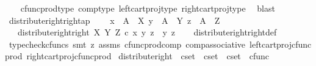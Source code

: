 \begin{isabellebody}
\ \ \isamarkupfalse%
\ cfunc{\isacharunderscore}{\kern0pt}prod{\isacharunderscore}{\kern0pt}type\ comp{\isacharunderscore}{\kern0pt}type\ left{\isacharunderscore}{\kern0pt}cart{\isacharunderscore}{\kern0pt}proj{\isacharunderscore}{\kern0pt}type\ right{\isacharunderscore}{\kern0pt}cart{\isacharunderscore}{\kern0pt}proj{\isacharunderscore}{\kern0pt}type\ \isamarkupfalse%
\ blast%
\endisatagproof
{\isafoldproof}%
%
\isadelimproof
\isanewline
%
\endisadelimproof
\isanewline
{}\isamarkupfalse%
\ distribute{\isacharunderscore}{\kern0pt}right{\isacharunderscore}{\kern0pt}right{\isacharunderscore}{\kern0pt}ap{\isacharcolon}{\kern0pt}\ \isanewline
\ \ \ {\isachardoublequoteopen}x\ {\isacharcolon}{\kern0pt}\ A\ {\isasymrightarrow}\ X{\isachardoublequoteclose}\ {\isachardoublequoteopen}y\ {\isacharcolon}{\kern0pt}\ A\ {\isasymrightarrow}\ Y{\isachardoublequoteclose}\ {\isachardoublequoteopen}z\ {\isacharcolon}{\kern0pt}\ A\ {\isasymrightarrow}\ Z{\isachardoublequoteclose}\isanewline
\ \ \ {\isachardoublequoteopen}distribute{\isacharunderscore}{\kern0pt}right{\isacharunderscore}{\kern0pt}right\ X\ Y\ Z\ {\isasymcirc}\isactrlsub c\ {\isasymlangle}{\isasymlangle}x{\isacharcomma}{\kern0pt}\ y{\isasymrangle}{\isacharcomma}{\kern0pt}\ z{\isasymrangle}\ {\isacharequal}{\kern0pt}\ {\isasymlangle}y{\isacharcomma}{\kern0pt}\ z{\isasymrangle}{\isachardoublequoteclose}\isanewline
%
\isadelimproof
\ \ %
\endisadelimproof
%
\isatagproof
{}\isamarkupfalse%
\ distribute{\isacharunderscore}{\kern0pt}right{\isacharunderscore}{\kern0pt}right{\isacharunderscore}{\kern0pt}def\ \ \isanewline
\ \ \isamarkupfalse%
\ {\isacharparenleft}{\kern0pt}typecheck{\isacharunderscore}{\kern0pt}cfuncs{\isacharcomma}{\kern0pt}\ smt\ {\isacharparenleft}{\kern0pt}z{}{\isacharparenright}{\kern0pt}\ assms\ cfunc{\isacharunderscore}{\kern0pt}prod{\isacharunderscore}{\kern0pt}comp\ comp{\isacharunderscore}{\kern0pt}associative{}\ left{\isacharunderscore}{\kern0pt}cart{\isacharunderscore}{\kern0pt}proj{\isacharunderscore}{\kern0pt}cfunc{\isacharunderscore}{\kern0pt}prod\ right{\isacharunderscore}{\kern0pt}cart{\isacharunderscore}{\kern0pt}proj{\isacharunderscore}{\kern0pt}cfunc{\isacharunderscore}{\kern0pt}prod{\isacharparenright}{\kern0pt}%
\endisatagproof
{\isafoldproof}%
%
\isadelimproof
\isanewline
%
\endisadelimproof
\isanewline
{}\isamarkupfalse%
\ distribute{\isacharunderscore}{\kern0pt}right\ {\isacharcolon}{\kern0pt}{\isacharcolon}{\kern0pt}\ {\isachardoublequoteopen}cset\ {\isasymRightarrow}\ cset\ {\isasymRightarrow}\ cset\ {\isasymRightarrow}\ cfunc{\isachardoublequoteclose}\ \isanewline

\end{isabellebody}
